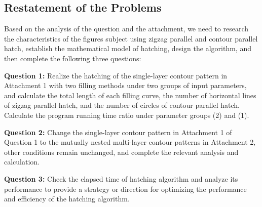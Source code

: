\subsection{Restatement of the Problems}
Based on the analysis of the question and the attachment, we need to research the characteristics of the figures subject using zigzag parallel and contour parallel hatch, establish the mathematical model of hatching, design the algorithm, and then complete the following three questions:

\textbf{Question 1:} Realize the hatching of the single-layer contour pattern in Attachment 1 with two filling methods under two groups of input parameters, and calculate the total length of each filling curve, the number of horizontal lines of zigzag parallel hatch, and the number of circles of contour parallel hatch. Calculate the program running time ratio under parameter groups (2) and (1).

\textbf{Question 2:} Change the single-layer contour pattern in Attachment 1 of Question 1 to the mutually nested multi-layer contour patterns in Attachment 2, other conditions remain unchanged, and complete the relevant analysis and calculation.

\textbf{Question 3:} Check the elapsed time of hatching algorithm and analyze its performance to provide a strategy or direction for optimizing the performance and efficiency of the hatching algorithm.

